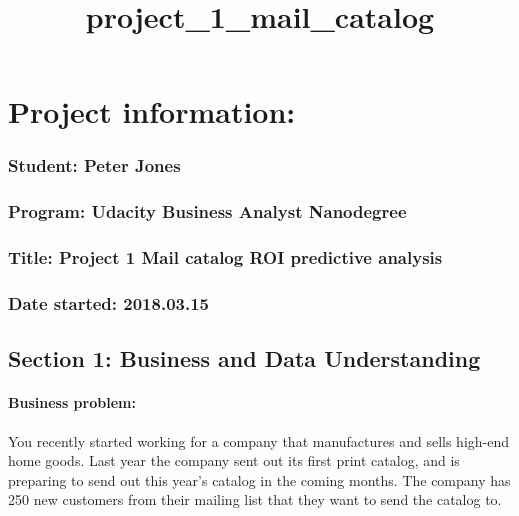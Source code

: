 \documentclass[11pt]{article}
\title{project\_1\_mail\_catalog}
\begin{document}
    
    
    \maketitle
    
    

    
    \section{Project information:}\label{project-information}

\subsubsection{Student: Peter Jones}\label{student-peter-jones}

\subsubsection{Program: Udacity \textbar{} Business Analyst
Nanodegree}\label{program-udacity-business-analyst-nanodegree}

\subsubsection{Title: Project 1 \textbar{} Mail catalog ROI predictive
analysis}\label{title-project-1-mail-catalog-roi-predictive-analysis}

\subsubsection{Date started: 2018.03.15}\label{date-started-2018.03.15}

    \subsection{Section 1: Business and Data
Understanding}\label{section-1-business-and-data-understanding}

    \paragraph{Business problem:}\label{business-problem}

You recently started working for a company that manufactures and sells
high-end home goods. Last year the company sent out its first print
catalog, and is preparing to send out this year's catalog in the coming
months. The company has 250 new customers from their mailing list that
they want to send the catalog to.
\end{document}
